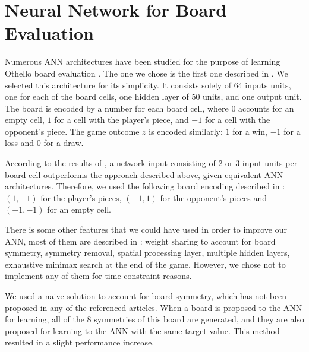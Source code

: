 \documentclass[a4paper, 9pt, twoside, twocolumn]{article}
\begin{document}
\section{Neural Network for Board Evaluation}
\label{sec:nnet}
Numerous ANN architectures have been studied for the purpose of learning Othello
board evaluation \cite{Binkly2007, Leouski1996}. The one we chose is the first
one described in \cite{Leouski1996}. We selected this architecture for its
simplicity. It consists solely of 64 inputs units, one for each of the board
cells, one hidden layer of 50 units, and one output unit. The board is encoded
by a number for each board cell, where $0$ accounts for an empty cell, $1$ for
a cell with the player's piece, and $-1$ for a cell with the opponent's piece.
The game outcome $z$ is encoded similarly: $1$ for a win, $-1$ for a loss and $0$
for a draw.

According to the results of \cite{Binkly2007}, a network input consisting of 2
or 3 input units per board cell outperforms the approach described above, given
equivalent ANN architectures. Therefore, we used the following board encoding
described in \cite{Binkly2007}: $(1, -1)$ for the player's pieces, $(-1, 1)$ for
the opponent's pieces and $(-1, -1)$ for an empty cell.

There is some other features that we could have used in order to improve our
ANN, most of them are described in \cite{Binkly2007}: weight sharing to account
for board symmetry, symmetry removal, spatial processing layer, multiple hidden
layers, exhaustive minimax search at the end of the game. However, we chose not
to implement any of them for time constraint reasons.

We used a naive solution to account for board symmetry, which has not been
proposed in any of the referenced articles. When a board is proposed to the ANN
for learning, all of the 8 symmetries of this board \cite{Binkly2007} are
generated, and they are also proposed for learning to the ANN with the same
target value. This method resulted in a slight performance increase.
\end{document}
